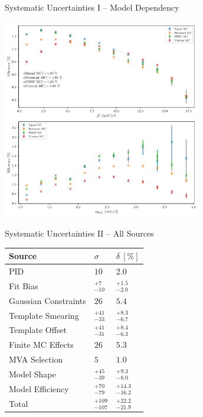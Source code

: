 \documentclass[serif]{beamer}
\begin{document}

\begin{frame}[t]{Systematic Uncertainties I -- Model Dependency}

\vspace{-3mm}
\small

\begin{center}
	\includegraphics[width=0.65\textwidth]{fig/efficiencies}
\end{center}	


\end{frame}


\begin{frame}[t]{Systematic Uncertainties II -- All Sources}

\vspace{-3mm}
\small

\begin{table}[H]
	\centering
	\begin{tabular}{l|l|l}
		Source & $\sigma$ & $\delta~[\%]$ \\
		\toprule
		PID & $10$ & $2.0$ \\
		Fit Bias & $ {}^{+7}_{-10}$ & ${}^{+1.5}_{-2.0}$ \\
		Gaussian Constraints & $26$ & $5.4$ \\
		Template Smearing & ${}^{+41}_{-33}$ & ${}^{+8.3}_{-6.7}$ \\
		Template Offset & ${}^{+41}_{-31}$ & ${}^{+8.4}_{-6.3}$ \\
		Finite MC Effects & $26$ & $5.3$ \\
		MVA Selection & $5$ & $1.0$\\
		Model Shape & ${}^{+45}_{-39}$ & ${}^{+9.3}_{-8.0}$ \\
		Model Efficiency & ${}^{+70}_{-79}$ & ${}^{+14.3}_{-16.2}$ \\
		\midrule
		Total & ${} ^{+109}_{-107}$ & ${}^{+22.2}_{-21.9}$ \\
		\bottomrule
	\end{tabular}
\end{table}


\end{frame}
\end{document}
